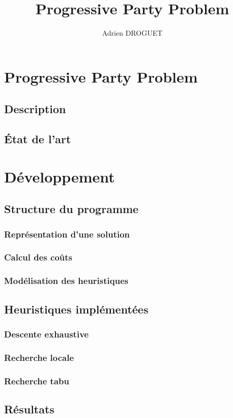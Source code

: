 \documentclass[a4paper,10pt]{report}
\title{Progressive Party Problem}
\author{Adrien DROGUET}
\begin{document}
\maketitle

\tableofcontents
\pagebreak


\chapter{Progressive Party Problem}
\section{Description}


\pagebreak
\section{État de l'art}

\pagebreak
\chapter{Développement}
\section{Structure du programme}
\subsection{Représentation d'une solution}

\subsection{Calcul des coûts}

\subsection{Modélisation des heuristiques}

\section{Heuristiques implémentées}
\subsection{Descente exhaustive}

\subsection{Recherche locale}

\subsection{Recherche tabu}

\pagebreak
\section{Résultats}
\end{document}
